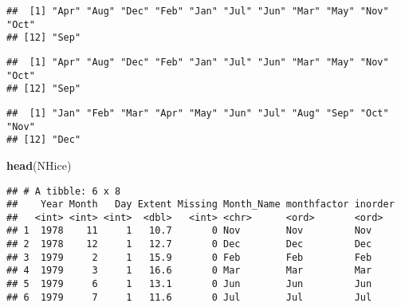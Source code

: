\documentclass[]{article}
\newenvironment{Shaded}{\begin{snugshade}}{\end{snugshade}}
\newcommand{\KeywordTok}[1]{\textcolor[rgb]{0.13,0.29,0.53}{\textbf{#1}}}
\newcommand{\DataTypeTok}[1]{\textcolor[rgb]{0.13,0.29,0.53}{#1}}
\newcommand{\OtherTok}[1]{\textcolor[rgb]{0.56,0.35,0.01}{#1}}
\newcommand{\OperatorTok}[1]{\textcolor[rgb]{0.81,0.36,0.00}{\textbf{#1}}}
\newcommand{\NormalTok}[1]{#1}
\begin{document}
\begin{Shaded}
\end{Shaded}

\begin{verbatim}
##  [1] "Apr" "Aug" "Dec" "Feb" "Jan" "Jul" "Jun" "Mar" "May" "Nov" "Oct"
## [12] "Sep"
\end{verbatim}

\begin{Shaded}
\end{Shaded}

\begin{verbatim}
##  [1] "Apr" "Aug" "Dec" "Feb" "Jan" "Jul" "Jun" "Mar" "May" "Nov" "Oct"
## [12] "Sep"
\end{verbatim}

\begin{Shaded}
\end{Shaded}

\begin{verbatim}
##  [1] "Jan" "Feb" "Mar" "Apr" "May" "Jun" "Jul" "Aug" "Sep" "Oct" "Nov"
## [12] "Dec"
\end{verbatim}

\begin{Shaded}
\begin{Highlighting}[]
\KeywordTok{head}\NormalTok{(NHice)}
\end{Highlighting}
\end{Shaded}

\begin{verbatim}
## # A tibble: 6 x 8
##    Year Month   Day Extent Missing Month_Name monthfactor inorder
##   <int> <int> <int>  <dbl>   <int> <chr>      <ord>       <ord>  
## 1  1978    11     1   10.7       0 Nov        Nov         Nov    
## 2  1978    12     1   12.7       0 Dec        Dec         Dec    
## 3  1979     2     1   15.9       0 Feb        Feb         Feb    
## 4  1979     3     1   16.6       0 Mar        Mar         Mar    
## 5  1979     6     1   13.1       0 Jun        Jun         Jun    
## 6  1979     7     1   11.6       0 Jul        Jul         Jul
\end{verbatim}
\end{document}
